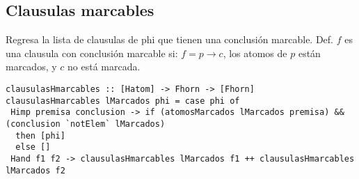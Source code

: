 \documentclass[11pt]{article}
\begin{document}
\subsection{Clausulas marcables}
\label{sec:org580102b}
Regresa la lista de clausulas de phi que tienen una conclusión marcable.
Def. \(f\) es una clausula con conclusión marcable si: \(f = p \rightarrow c\), los atomos de \(p\) están marcados, y \(c\) no está marcada.

\begin{verbatim}
clausulasHmarcables :: [Hatom] -> Fhorn -> [Fhorn]
clausulasHmarcables lMarcados phi = case phi of
 Himp premisa conclusion -> if (atomosMarcados lMarcados premisa) && 
(conclusion `notElem` lMarcados)
  then [phi]
  else []
 Hand f1 f2 -> clausulasHmarcables lMarcados f1 ++ clausulasHmarcables lMarcados f2
\end{verbatim}
\end{document}
